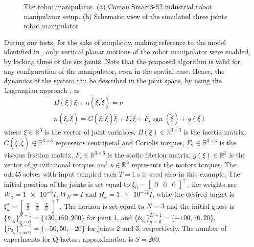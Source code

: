 \documentclass[10pt]{IEEEtran}      %
\DeclareMathOperator{\sgn}{sgn}
\newcommand{\R}{\mathbb{R}}
\theoremstyle{theorem}
\theoremstyle{remark}
\begin{document}
\begin{figure}[htb!]
{}
\caption{The robot manipulator. (a) Comau Smart3-S2 industrial robot manipulator setup. (b) Schematic view of the simulated three joints robot manipulator}
\label{fig:robot}
\end{figure}

During our tests, for the sake of simplicity, making reference to the model identified in \cite{calanca2011identification}, only vertical planar motions of the robot manipulator were enabled, by locking three of the six joints. Note that the proposed algorithm is valid for any configuration of the manipulator, even in the spatial case.
Hence, the dynamics of the system can be described in the joint space, by using the Lagrangian approach \cite{siciliano2009robot}, as 
\begin{align}
\label{eq:dyn}
&B(\xi)\ddot{\xi} + n(\xi,\dot{\xi}) = \nu\\
\label{eq:apparent}
&n(\xi,\dot{\xi}) = C(\xi,\dot{\xi})\dot{\xi}+F_\mathrm{v}\dot{\xi} + F_\mathrm{s} \sgn(\dot{\xi}) + g(\xi) 
\end{align}
where $\xi\in\R^3$ is the vector of joint variables, $B(\xi) \in\R^{3\times 3}$ is the inertia matrix, $C(\xi,\dot{\xi}) \in\R^{3\times 3}$ represents centripetal and Coriolis torques, $F_\mathrm{v} \in \R^{3\times 3}$ is the viscous friction matrix, $F_\mathrm{s} \in \R^{3\times 3}$ is the static friction matrix, $g(\xi) \in \R^3$ is the vector of gravitational torques and $\nu\in \R^3$ represents the motors torques. 
The ode45 solver with input sampled each $T=\SI{1}{\second}$ is used also in this example. The initial position of the joints is set equal to $\xi_0=[\begin{array}{ccc}
0 & 0 & 0
\end{array}]^\top$, the weights are $W_\kappa=\num{1e-6} I$, $W_N=I$ and $R_\kappa=\num{1e-12}I$, while the desired target is $\xi_k^\diamond = \left[\begin{array}{ccc}\tfrac{\pi}{3} & \tfrac{\pi}{4} & \tfrac{\pi}{3}
\end{array}\right]^\top$. The horizon is set equal to $N=3$ and the initial guess is $\{\bar{\nu}_{1_\kappa}\}_{\kappa=0}^{N-1}=\{130, 160, 200\}$ for joint 1, and $\{\bar{\nu}_{2_\kappa}\}_{\kappa=0}^{N-1}=\{-100, 70, 20\}$, $\{\bar{\nu}_{3_\kappa}\}_{\kappa=0}^{N-1}=\{-50, 50, -20\}$ for joints 2 and 3, respectively. The number of experiments for Q-factors  approximation is $S=\num{200}$.
\end{document}

